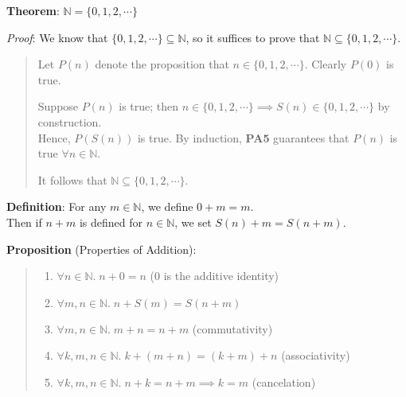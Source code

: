 \documentclass[11pt]{article}
\begin{document}
\textbf{Theorem}: $\mathbb{N} = \{0, 1, 2, \cdots\}$

\emph{Proof}: We know that $\{0, 1, 2, \cdots\} \subseteq \mathbb{N}$, so it suffices to prove that $\mathbb{N} \subseteq \{0, 1, 2, \cdots\}$.

\begin{quote}\vspace{-0.3cm}
	Let $P(n)$ denote the proposition that $n \in \{0, 1, 2, \cdots\}$. Clearly $P(0)$ is true.

	Suppose $P(n)$ is true; then $n \in \{0, 1, 2, \cdots\} \implies S(n) \in \{0, 1, 2, \cdots\}$ by construction.\\
	Hence, $P(S(n))$ is true. By induction, \textbf{PA5} guarantees that $P(n)$ is true $\forall n \in \mathbb{N}$.

	It follows that $\mathbb{N} \subseteq \{0, 1, 2, \cdots\}$.
\end{quote}

\textbf{Definition}: For any $m \in \mathbb{N}$, we define $0 + m = m$.\\
Then if $n + m$ is defined for $n \in \mathbb{N}$, we set $S(n) + m = S(n + m)$.

\textbf{Proposition} (Properties of Addition):
\begin{quote}\vspace{-0.3cm}
	\begin{enumerate}
	\item $\forall n \in \mathbb{N}.\; n + 0 = n$ \hspace{4.2cm} (0 is the additive identity)
	\item $\forall m,n \in \mathbb{N}.\; n + S(m) = S(n + m)$
	\item $\forall m,n \in \mathbb{N}.\; m + n = n + m$ \hspace{2.8cm} (commutativity)
	\item $\forall k,m,n \in \mathbb{N}.\; k + (m+n) = (k+m) + n$ \hspace{0.5cm} (associativity)
	\item $\forall k,m,n \in \mathbb{N}.\; n + k = n + m \implies k = m$ \hspace{0.5cm} (cancelation)
	\end{enumerate}
\end{quote}
\end{document}

